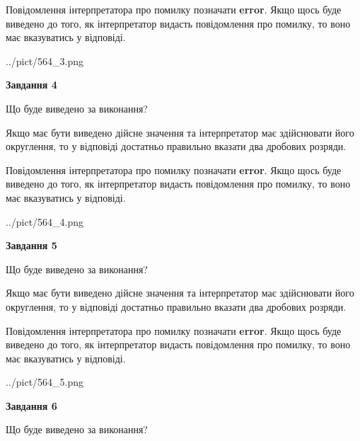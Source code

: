 \documentclass[12pt, ukrainian]{article}
\begin{document}
{\begin {Large}
Повідомлення інтерпретатора про помилку позначати \textbf{error}.
Якщо щось буде виведено до того, як інтерпретатор видасть повідомлення про помилку, 
то воно має вказуватись у відповіді. \par

\begin{center}
	{../pict/564_3.png}
\end{center}
\newpage

{\begin {center}\textbf{Завдання 4}\end {center}}\par
Що буде виведено за виконання? \par

Якщо має бути виведено дійсне значення та інтерпретатор має здійснювати його округлення, 
то у відповіді достатньо правильно вказати два дробових розряди.

Повідомлення інтерпретатора про помилку позначати \textbf{error}.
Якщо щось буде виведено до того, як інтерпретатор видасть повідомлення про помилку, 
то воно має вказуватись у відповіді. \par

\begin{center}
	{../pict/564_4.png}
\end{center}
\newpage

{\begin {center}\textbf{Завдання 5}\end {center}}\par
Що буде виведено за виконання? \par

Якщо має бути виведено дійсне значення та інтерпретатор має здійснювати його округлення, 
то у відповіді достатньо правильно вказати два дробових розряди.

Повідомлення інтерпретатора про помилку позначати \textbf{error}.
Якщо щось буде виведено до того, як інтерпретатор видасть повідомлення про помилку, 
то воно має вказуватись у відповіді. \par

\begin{center}
	{../pict/564_5.png}
\end{center}
\newpage

{\begin {center}\textbf{Завдання 6}\end {center}}\par
Що буде виведено за виконання? \par


\end{Large}}
\end{document}
